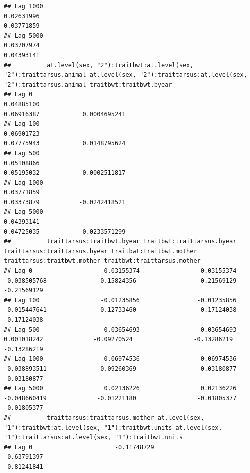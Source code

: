 \documentclass[
  12pt,
]{book}
\begin{document}
\begin{verbatim}
## Lag 1000                                                     0.02631996                                                        0.03771859
## Lag 5000                                                     0.03707974                                                        0.04393141
##          at.level(sex, "2"):traitbwt:at.level(sex, "2"):traittarsus.animal at.level(sex, "2"):traittarsus:at.level(sex, "2"):traittarsus.animal traitbwt:traitbwt.byear
## Lag 0                                                           0.04885100                                                           0.06916387            0.0004695241
## Lag 100                                                         0.06901723                                                           0.07775943            0.0148795624
## Lag 500                                                         0.05108866                                                           0.05195032           -0.0002511817
## Lag 1000                                                        0.03771859                                                           0.03373879           -0.0242418521
## Lag 5000                                                        0.04393141                                                           0.04725035           -0.0233571299
##          traittarsus:traitbwt.byear traitbwt:traittarsus.byear traittarsus:traittarsus.byear traitbwt:traitbwt.mother traittarsus:traitbwt.mother traitbwt:traittarsus.mother
## Lag 0                   -0.03155374                -0.03155374                  -0.038505768              -0.15824356                 -0.21569129                 -0.21569129
## Lag 100                 -0.01235856                -0.01235856                  -0.015447641              -0.12733460                 -0.17124038                 -0.17124038
## Lag 500                 -0.03654693                -0.03654693                   0.001018242              -0.09270524                 -0.13286219                 -0.13286219
## Lag 1000                -0.06974536                -0.06974536                  -0.038893511              -0.09260369                 -0.03180877                 -0.03180877
## Lag 5000                 0.02136226                 0.02136226                  -0.048660419              -0.01221180                 -0.01805377                 -0.01805377
##          traittarsus:traittarsus.mother at.level(sex, "1"):traitbwt:at.level(sex, "1"):traitbwt.units at.level(sex, "1"):traittarsus:at.level(sex, "1"):traitbwt.units
## Lag 0                       -0.11748729                                                   -0.63791397                                                      -0.81241841

\end{verbatim}
\end{document}
